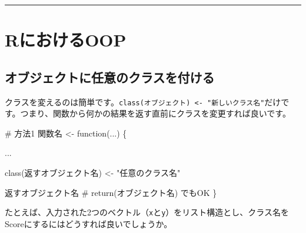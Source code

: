 \documentclass[
  a4paper,
  pandoc,
  ja=standard,
  jafont=haranoaji]{bxjsbook}
\newenvironment{Shaded}{\begin{snugshade}}{\end{snugshade}}
\newcommand{\CommentTok}[1]{\textcolor[rgb]{0.37,0.37,0.37}{#1}}
\newcommand{\ControlFlowTok}[1]{\textcolor[rgb]{0.00,0.48,0.65}{#1}}
\newcommand{\FunctionTok}[1]{\textcolor[rgb]{0.28,0.35,0.67}{#1}}
\newcommand{\NormalTok}[1]{\textcolor[rgb]{0.00,0.48,0.65}{#1}}
\newcommand{\OtherTok}[1]{\textcolor[rgb]{0.00,0.48,0.65}{#1}}
\newcommand{\StringTok}[1]{\textcolor[rgb]{0.13,0.47,0.30}{#1}}
\begin{document}
\begin{center}\rule{0.5\linewidth}{0.5pt}\end{center}

\hypertarget{sec-oop_in_r}{%
\section{RにおけるOOP}\label{sec-oop_in_r}}

\hypertarget{ux30aaux30d6ux30b8ux30a7ux30afux30c8ux306bux4efbux610fux306eux30afux30e9ux30b9ux3092ux4ed8ux3051ux308b}{%
\subsection{オブジェクトに任意のクラスを付ける}\label{ux30aaux30d6ux30b8ux30a7ux30afux30c8ux306bux4efbux610fux306eux30afux30e9ux30b9ux3092ux4ed8ux3051ux308b}}

クラスを変えるのは簡単です。\texttt{class(オブジェクト)\ \textless{}-\ "新しいクラス名"}だけです。つまり、関数から何かの結果を返す直前にクラスを変更すれば良いです。

\begin{Shaded}
\begin{Highlighting}[numbers=left,,]
\CommentTok{\# 方法1}
\NormalTok{関数名 }\OtherTok{\textless{}{-}} \ControlFlowTok{function}\NormalTok{(...) \{}
  
\NormalTok{  ...}
  
  \FunctionTok{class}\NormalTok{(返すオブジェクト名) }\OtherTok{\textless{}{-}} \StringTok{"任意のクラス名"}
  
\NormalTok{  返すオブジェクト名 }\CommentTok{\# return(オブジェクト名) でもOK}
\NormalTok{\}}
\end{Highlighting}
\end{Shaded}

たとえば、入力された2つのベクトル（\texttt{x}と\texttt{y}）をリスト構造とし、クラス名をScoreにするにはどうすれば良いでしょうか。
\end{document}

